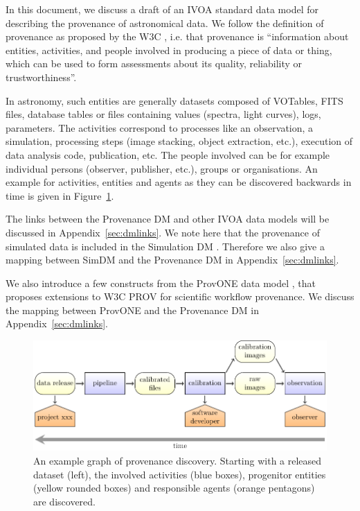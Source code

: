 
In this document, we discuss a draft of an IVOA standard data model for
describing the provenance of astronomical data. 
We follow the definition of provenance as proposed by the W3C \citep{std:W3CProvDM}, i.e. that provenance is ``information about entities, activities, and people involved in producing a piece of data or thing, which can be used to form assessments about its quality, reliability or trustworthiness''.

In astronomy, such entities are generally datasets composed of VOTables, FITS
files, database tables or files containing values (spectra, light curves), logs,
parameters.
The activities correspond to processes like an observation, a
simulation, processing steps (image stacking, object extraction, etc.), execution of data analysis code, publication, etc.
The people involved can be for example individual persons (observer, publisher, etc.), groups or organisations. An example for activities, entities and agents as they can be discovered backwards in time is given in Figure~\ref{fig:example-workflow}.

The links between the Provenance DM and other IVOA data models will be discussed in Appendix~\ref{sec:dmlinks}. We note here that the provenance of simulated data is included in the Simulation DM \citep[SimDM,][]{2012ivoa.spec.0503L}. Therefore we also give a mapping between SimDM and the Provenance DM in Appendix~\ref{sec:dmlinks}.

We also introduce a few constructs from the ProvONE data model \citep{ProvONE}, that proposes extensions to W3C PROV for scientific workflow provenance. We discuss the mapping between ProvONE and the Provenance DM in Appendix~\ref{sec:dmlinks}.

\begin{figure}[ht]
\centering
\includegraphics[width=1\textwidth]{workflow-backwards.pdf}
\caption[Example graph of provenance discovery]{An example graph of provenance discovery. Starting with a released dataset (left), the involved activities (blue boxes), 
progenitor entities (yellow rounded boxes) and responsible agents (orange pentagons) are 
discovered.}
\label{fig:example-workflow}
\end{figure}


